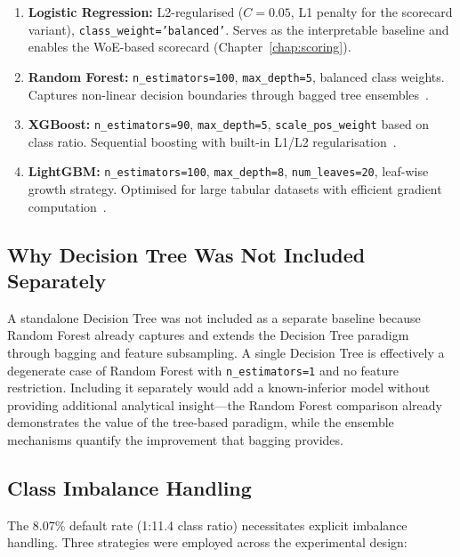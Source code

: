 \begin{enumerate}
    \item \textbf{Logistic Regression:} L2-regularised ($C=0.05$, L1 penalty for the scorecard variant), \texttt{class\_weight='balanced'}. Serves as the interpretable baseline and enables the WoE-based scorecard (Chapter~\ref{chap:scoring}).
    \item \textbf{Random Forest:} \texttt{n\_estimators=100}, \texttt{max\_depth=5}, balanced class weights. Captures non-linear decision boundaries through bagged tree ensembles~\cite{breiman2001}.
    \item \textbf{XGBoost:} \texttt{n\_estimators=90}, \texttt{max\_depth=5}, \texttt{scale\_pos\_weight} based on class ratio. Sequential boosting with built-in L1/L2 regularisation~\cite{chen2016}.
    \item \textbf{LightGBM:} \texttt{n\_estimators=100}, \texttt{max\_depth=8}, \texttt{num\_leaves=20}, leaf-wise growth strategy. Optimised for large tabular datasets with efficient gradient computation~\cite{ke2017}.
\end{enumerate}

\subsection{Why Decision Tree Was Not Included Separately}

A standalone Decision Tree was not included as a separate baseline because Random Forest already captures and extends the Decision Tree paradigm through bagging and feature subsampling. A single Decision Tree is effectively a degenerate case of Random Forest with \texttt{n\_estimators=1} and no feature restriction. Including it separately would add a known-inferior model without providing additional analytical insight---the Random Forest comparison already demonstrates the value of the tree-based paradigm, while the ensemble mechanisms quantify the improvement that bagging provides.

\subsection{Class Imbalance Handling}

The 8.07\% default rate (1:11.4 class ratio) necessitates explicit imbalance handling. Three strategies were employed across the experimental design:

